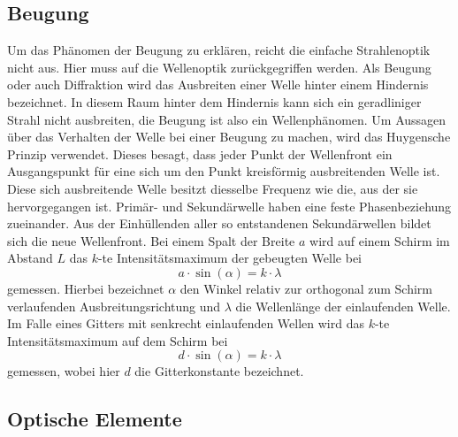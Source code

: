 \subsection{Beugung}
\label{sec:beugung}
Um das Phänomen der Beugung zu erklären, reicht die einfache Strahlenoptik nicht aus. Hier muss auf die Wellenoptik
zurückgegriffen werden. Als Beugung oder auch Diffraktion wird das Ausbreiten einer Welle hinter einem
Hindernis bezeichnet. In diesem Raum hinter dem Hindernis kann sich ein geradliniger Strahl nicht ausbreiten, die Beugung ist
also ein Wellenphänomen. Um Aussagen über das Verhalten der Welle bei einer Beugung zu machen, wird das Huygensche
Prinzip verwendet. Dieses besagt, dass jeder Punkt der Wellenfront ein Ausgangspunkt für eine sich um den Punkt kreisförmig
ausbreitenden Welle ist. Diese sich ausbreitende Welle besitzt diesselbe Frequenz wie die, aus der sie hervorgegangen
ist. Primär- und Sekundärwelle haben eine feste Phasenbeziehung zueinander. Aus der Einhüllenden aller so
entstandenen Sekundärwellen bildet sich die neue Wellenfront. Bei einem Spalt der Breite $a$ wird auf einem Schirm
im Abstand $L$ das $k$-te Intensitätsmaximum der gebeugten Welle bei
\begin{equation}
  \label{eqn:spaltintmax}
  a \cdot \sin(\alpha) = k \cdot \lambda
\end{equation}
gemessen. Hierbei bezeichnet $\alpha$ den Winkel relativ zur orthogonal zum Schirm verlaufenden Ausbreitungsrichtung
und $\lambda$ die Wellenlänge der einlaufenden Welle.
Im Falle eines Gitters mit senkrecht einlaufenden Wellen wird das $k$-te Intensitätsmaximum auf dem Schirm bei
\begin{equation}
  \label{eqn:gitterintmax}
  d \cdot \sin(\alpha) = k \cdot \lambda
\end{equation}
gemessen, wobei hier $d$ die Gitterkonstante bezeichnet.

\subsection{Optische Elemente}
\label{sec:optischeelemente}

